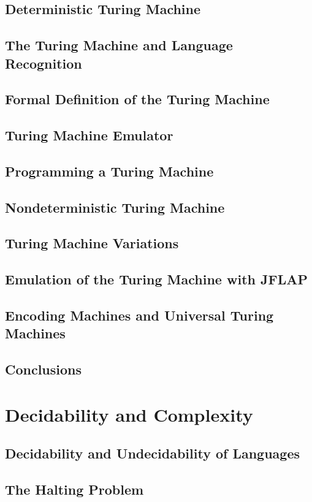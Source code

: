 \documentclass[a4paper]{article}
\begin{document}
\subsection{Deterministic Turing Machine}
\subsection{The Turing Machine and Language Recognition}
\subsection{Formal Definition of the Turing Machine}
\subsection{Turing Machine Emulator}
\subsection{Programming a Turing Machine}
\subsection{Nondeterministic Turing Machine}
\subsection{Turing Machine Variations}
\subsection{Emulation of the Turing Machine with JFLAP}
\subsection{Encoding Machines and Universal Turing Machines}
\subsection{Conclusions}

\newpage
\section{Decidability and Complexity}
\subsection{Decidability and Undecidability of Languages}
\subsection{The Halting Problem}
\end{document}
